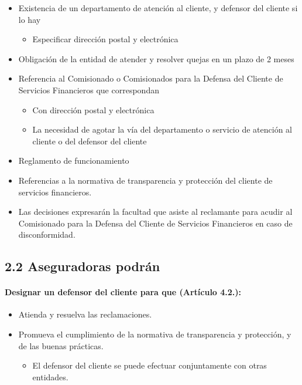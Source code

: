 \documentclass[
]{article}
\providecommand{\tightlist}{%
  \setlength{\itemsep}{0pt}\setlength{\parskip}{0pt}}
\begin{document}
\begin{itemize}
\tightlist
\item
  Existencia de un departamento de atención al cliente, y defensor del
  cliente si lo hay

  \begin{itemize}
  \tightlist
  \item
    Especificar dirección postal y electrónica
  \end{itemize}
\item
  Obligación de la entidad de atender y resolver quejas en un plazo de 2
  meses
\item
  Referencia al Comisionado o Comisionados para la Defensa del Cliente
  de Servicios Financieros que correspondan

  \begin{itemize}
  \tightlist
  \item
    Con dirección postal y electrónica
  \item
    La necesidad de agotar la vía del departamento o servicio de
    atención al cliente o del defensor del cliente
  \end{itemize}
\item
  Reglamento de funcionamiento
\item
  Referencias a la normativa de transparencia y protección del cliente
  de servicios financieros.
\item
  Las decisiones expresarán la facultad que asiste al reclamante para
  acudir al Comisionado para la Defensa del Cliente de Servicios
  Financieros en caso de disconformidad.
\end{itemize}

\hypertarget{aseguradoras-podruxe1n}{%
\subsection{2.2 Aseguradoras podrán}\label{aseguradoras-podruxe1n}}

\hypertarget{designar-un-defensor-del-cliente-para-que-artuxedculo-4.2.}{%
\paragraph{\texorpdfstring{Designar un defensor del cliente para que
(\textbf{Artículo
4.2.}):}{Designar un defensor del cliente para que (Artículo 4.2.):}}\label{designar-un-defensor-del-cliente-para-que-artuxedculo-4.2.}}

\begin{itemize}
\tightlist
\item
  Atienda y resuelva las reclamaciones.
\item
  Promueva el cumplimiento de la normativa de transparencia y
  protección, y de las buenas prácticas.

  \begin{itemize}
  \tightlist
  \item
    El defensor del cliente se puede efectuar conjuntamente con otras
    entidades.
  \end{itemize}
\end{itemize}
\end{document}
